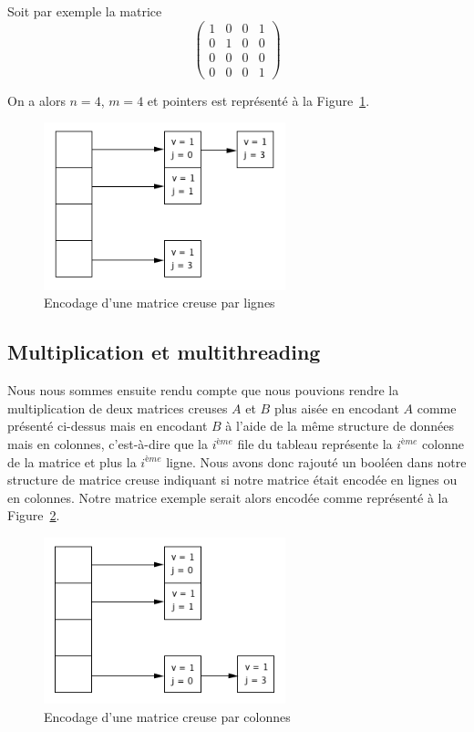 \documentclass[12pt,a4paper]{article}
\begin{document}
Soit par exemple la matrice
$$\begin{pmatrix}
   1 & 0 & 0 & 1 \\
   0 & 1 & 0 & 0 \\
   0 & 0 & 0 & 0 \\
   0 & 0 & 0 & 1  
\end{pmatrix}$$

On a alors $n = 4$, $m = 4$ et pointers est représenté à la Figure~\ref{encodage}.
\begin{figure}[!h]
	\begin{center}
		\includegraphics[width=7cm]{encodage.png}
		\caption{Encodage d'une matrice creuse par lignes}
		\label{encodage}
	\end{center}
\end{figure}


\subsection{Multiplication et multithreading}
Nous nous sommes ensuite rendu compte que nous pouvions rendre la multiplication de deux matrices creuses $A$ et $B$ plus aisée en encodant $A$ comme présenté ci-dessus mais en encodant $B$ à l'aide de la même structure de données mais en colonnes, c'est-à-dire que la $i^{ème}$ file du tableau représente la $i^{ème}$ colonne de la matrice et plus la $i^{ème}$ ligne. Nous avons donc rajouté un booléen dans notre structure de matrice creuse indiquant si notre matrice était encodée en lignes ou en colonnes. Notre matrice exemple serait alors encodée comme représenté à la Figure~\ref{encodage2}.\\

\begin{figure}[!!h]
	\begin{center}
		\includegraphics[width=7cm]{encodage2.png}
		\caption{Encodage d'une matrice creuse par colonnes}
		\label{encodage2}
	\end{center}
\end{figure}
\end{document}
